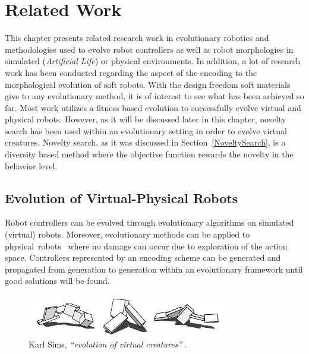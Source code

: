 
\chapter{Related Work} %

\label{Related Work} %


This chapter presents related research work in evolutionary robotics and methodologies used to evolve robot controllers as well as robot morphologies in simulated (\emph{Artificial Life}) or physical environments. In addition, a lot of research work has been conducted regarding the aspect of the encoding to the morphological evolution of soft robots. With the design freedom soft materials give to any evolutionary method, it is of interest to see what has been achieved so far. Most work utilizes a fitness based evolution to successfully evolve virtual and physical robots. However, as it will be discussed later in this chapter, novelty search has been used within an evolutionary setting in order to evolve virtual creatures. Novelty search, as it was discussed in Section~\ref{NoveltySearch}, is a diversity based method where the objective function rewards the novelty in the behavior level.


\section{Evolution of Virtual-Physical Robots}

Robot controllers can be evolved through evolutionary algorithms on simulated (virtual) robots. Moreover, evolutionary methods can be applied to physical~robots~\citep{nolfi1994evolve} where no damage can occur due to exploration of the action space. Controllers represented by an encoding scheme can be generated and propagated from generation to generation within an evolutionary framework until good solutions will be found.

\begin{figure}[b!]
\centering
\includegraphics[width=0.8\textwidth]{../Figures/Misc/evolvingVirtualCreatures.png}
\caption{Karl Sims, \textit{``evolution of virtual creatures''} \citep{sims1994evolving}.}
\label{fig:karlSims}
\end{figure}

